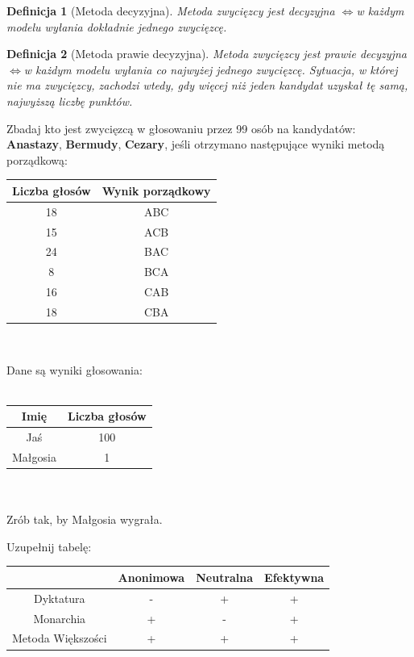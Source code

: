 \documentclass[12pt,a4paper]{article}
\theoremstyle{break}
\newtheorem{definition}{Definicja}[section]
\newcommand{\witw}{$\Leftrightarrow$}
\begin{document}
\begin{definition}[Metoda decyzyjna]
	Metoda zwycięzcy jest decyzyjna \witw w każdym modelu wyłania dokładnie jednego zwycięzcę.
\end{definition}

\begin{definition}[Metoda prawie decyzyjna]
	Metoda zwycięzcy jest prawie decyzyjna \witw w każdym modelu wyłania co najwyżej jednego zwycięzcę. Sytuacja, w której nie ma zwycięzcy, zachodzi wtedy, gdy więcej niż jeden kandydat uzyskał tę samą, najwyższą liczbę punktów.
\end{definition}

\begin{zad}
	Zbadaj kto jest zwycięzcą w głosowaniu przez 99 osób na kandydatów: \textbf{Anastazy}, \textbf{Bermudy}, \textbf{Cezary}, jeśli otrzymano następujące wyniki metodą porządkową:
\end{zad}

	\begin{tabular}{|c|c|}\hline
		Liczba głosów	& Wynik porządkowy\\\hline
		18        		& ABC\\\hline
		15    			& ACB\\\hline
		24     			& BAC\\\hline
		8 				& BCA\\\hline
		16     			& CAB\\\hline
		18 				& CBA\\\hline
	\end{tabular}\\
	
\begin{zad}
	Dane są wyniki głosowania:\\\\
	\begin{tabular}{|c|c|}\hline
		Imię		& Liczba głosów\\\hline
		Jaś        	& 100\\\hline
		Małgosia    & 1\\\hline
	\end{tabular}\\\\
	Zrób tak, by Małgosia wygrała.
\end{zad}

\begin{zad}
	Uzupełnij tabelę:\\
	\begin{tabular}{|c|c|c|c|}\hline
		& Anonimowa & Neutralna & Efektywna\\\hline
		Dyktatura   &-&+&+\\\hline
		Monarchia   &+&-&+\\\hline
		Metoda Większości &+&+&+\\\hline
	\end{tabular}\\
\end{zad}
\end{document}
